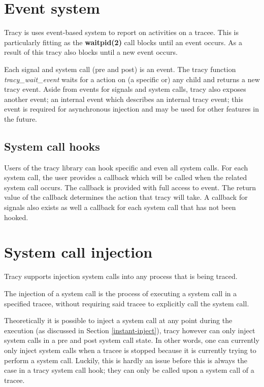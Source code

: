 \documentclass[a4paper, 10pt]{report}
\begin{document}

\section{Event system}
\label{event-system}

Tracy is uses event-based system to report on activities on a tracee. This is
particularly fitting as the \textbf{waitpid(2)} call blocks until an event
occurs. As a result of this tracy also blocks until a new event occurs.

Each signal and system call (pre and post) is an event.
The tracy function \textit{tracy\_wait\_event} waits for a action on
(a specific or) any child and returns a new tracy event. Aside from
events for signals and system calls, tracy also exposes another event; an
internal event which describes an internal tracy event; this event is required
for asynchronous injection and may be used for other features in the future.

\subsection{System call hooks}

Users of the tracy library can hook specific and even all system calls. For
each system call, the user provides a callback which will be called when
the related system call occurs. The callback is provided with full access to
event. The return value of the callback determines the action that tracy
will take. A callback for signals also exists as well a callback for each
system call that has not been hooked.

\section{System call injection}

Tracy supports injection system calls into any process that is being traced.

The injection of a system call is the process of executing a system call in
a specified tracee, without requiring said tracee to explicitly call the
system call.

Theoretically it is possible to inject a system call at any point during
the execution (as discussed in Section \ref{instant-inject}),
tracy however can only inject system calls in a pre and post
system call state. In other words, one can currently only inject system calls
when a tracee is stopped because it is currently trying to perform a system
call. Luckily, this is hardly an issue before this is always the case in a
tracy system call hook; they can only be called upon a system call of a tracee.
\end{document}
